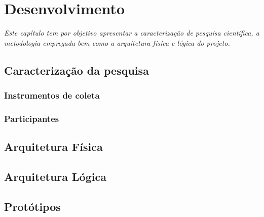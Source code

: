 \chapter{Desenvolvimento}
\label{cap:03}

\textit{Este capítulo tem por objetivo apresentar a caracterização de pesquisa científica, a metodologia empregada bem como a arquitetura física e lógica do projeto.}\\

\section{Caracterização da pesquisa}

\subsection{Instrumentos de coleta}

\subsection{Participantes}

\section{Arquitetura Física}

\section{Arquitetura Lógica}

\section{Protótipos}